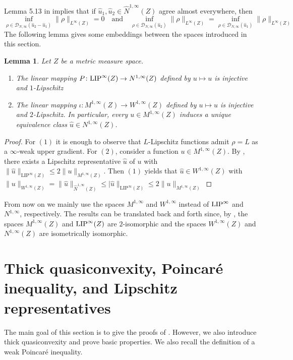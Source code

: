 \documentclass[reqno]{amsart}
\newcommand{\LIP}{{\rm LIP}}
\numberwithin{equation}{section}
\newtheorem{lemma}[theorem]{Lemma}
\theoremstyle{remark}
\begin{document}
Lemma 5.13 in \cite{Durand} implies that if $\widehat{u}_1, \widehat{u}_2 \in \widehat{N}^{1,\infty}(Z)$ agree almost everywhere, then
\begin{equation*}
    \inf_{ \rho \in \mathcal{D}_{N,\infty}( \widehat{u}_2 - \widehat{u}_1 ) }\| \rho\|_{L^\infty(Z)}
    =
    0
    \quad\text{and}\quad
    \inf_{ \rho \in \mathcal{D}_{N,\infty}( \widehat{u}_2 ) }\| \rho\|_{L^\infty(Z)}
    =
    \inf_{ \rho \in \mathcal{D}_{N,\infty}( \widehat{u}_1 ) }\| \rho\|_{L^\infty(Z)}
\end{equation*}
The following lemma gives some embeddings between the spaces introduced in this section.
\begin{lemma}\label{lemma:M:in:W}
Let $Z$ be a metric measure space. 
\begin{enumerate}
    \item The linear mapping $P\colon\LIP^{\infty}(Z)\to N^{1,\infty}(Z)$  defined by $u\mapsto u$ is injective and $1$-Lipschitz
    \item The linear mapping $\iota \colon M^{1,\infty}( Z ) \rightarrow W^{1,\infty}( Z )$ defined by $u \mapsto u$ is injective and $2$-Lipschitz. In particular, every $u \in M^{1,\infty}( Z )$ induces a unique equivalence class $\widehat{u} \in N^{1,\infty}( Z )$.
\end{enumerate}\end{lemma}

\begin{proof}
For $(1)$ it is enough to observe that $L$-Lipschitz functions admit $\rho=L$ as a $\infty$-weak upper gradient. For $(2)$, consider a function $u\in M^{1,\infty}(Z)$. By , there exists a Lipschitz representative $\widehat u$ of $u$ with $\|\widehat u\|_{\text{LIP}^{\infty}(Z)}\leq 2 \|u\|_{M^{1,\infty}(Z)}$. Then $(1)$  yields that $\widehat u\in W^{1,\infty}(Z)$ with $\|u\|_{W^{1,\infty}(Z)}=\|\widehat u\|_{\widehat{N}^{1,\infty}(Z)}\leq |\widehat u\|_{\text{LIP}^{\infty}(Z)}\leq 2 \|u\|_{M^{1,\infty}(Z)}$
\end{proof}
From now on we mainly use the spaces $M^{1,\infty}$ and $W^{1,\infty}$ instead of $\LIP^{\infty}$ and $N^{1,\infty}$, respectively. The results can be translated back and forth since, by , the spaces $M^{1,\infty}(Z)$ and $\LIP^{\infty}(Z)$ are $2$-isomorphic and the spaces $W^{1,\infty}(Z)$ and $N^{1,\infty}(Z)$ are isometrically isomorphic.




\section{Thick quasiconvexity, Poincaré inequality, and Lipschitz representatives}\label{sec:thick}
The main goal of this section is to give the proofs of . However, we also introduce thick quasiconvexity and prove basic properties. We also recall the definition of a weak Poincaré inequality. 
\end{document}
